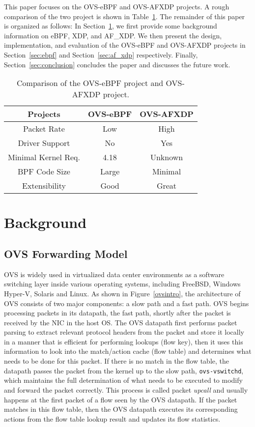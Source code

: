 \documentclass[10pt]{sigplanconf}
\begin{document}
This paper focuses on the OVS-eBPF and OVS-AFXDP projects.
A rough comparison of the two project is shown in Table~\ref{proj-compare}.
The remainder of this paper is organized as follows:
In Section~\ref{sec:background}, we first provide some background information
on eBPF, XDP, and AF\_XDP.  We then present the design, implementation, and
evaluation of the OVS-eBPF and OVS-AFXDP projects in Section~\ref{sec:ebpf}
and Section~\ref{sec:af_xdp} respectively. Finally,
Section~\ref{sec:conclusion} concludes the paper and discusses the future work.

\begin{table}
\centering
\scriptsize
\begin{tabular}{|c | c | c|}
\hline
 {\bf Projects} & {\bf OVS-eBPF } & {\bf OVS-AFXDP} \\ \hline\hline
  Packet Rate & Low & High \\ \hline
  Driver Support & No & Yes \\ \hline
  Minimal Kernel Req. & 4.18 & Unknown \\ \hline
  BPF Code Size & Large & Minimal \\ \hline
  Extensibility & Good & Great \\ \hline
  \end{tabular}
\caption{\footnotesize
Comparison of the OVS-eBPF project and OVS-AFXDP project.
}
\label{proj-compare}
\end{table}

\section{Background}
\label{sec:background}

\subsection{OVS Forwarding Model}
OVS is widely used in virtualized data center environments as a software
switching layer inside various operating systems, including FreeBSD,
Windows Hyper-V, Solaris and Linux. As shown in
Figure~\ref{ovsintro}, the architecture of OVS consists of two major
components: a slow path and a fast path. OVS begins processing packets
in its datapath, the fast path, shortly after the packet is received by the NIC in the host OS.
The OVS datapath first performs packet parsing to extract relevant protocol
headers from the packet and store it locally in a manner that is efficient for
performing lookups (flow key), then it uses this information to look into the
match/action cache (flow table) and determines what needs to be done for this
packet. If there is no match in the flow table, the datapath passes the packet
from the kernel up to the slow path, \verb+ovs-vswitchd+, which maintains the
full determination of what needs to be executed to modify and forward
the packet correctly.  This process is called packet {\em upcall} and
usually happens at the first packet of a flow seen by the OVS datapath.
If the packet matches in this flow table, then the OVS datapath executes its
corresponding actions from the flow table lookup result and updates its flow
statistics.
\end{document}
